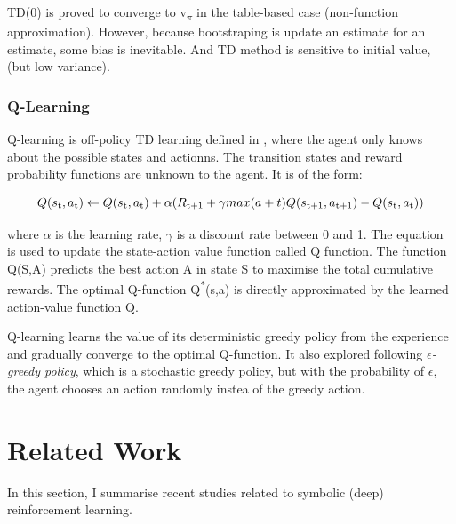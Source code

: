 \documentclass[12pt,twoside]{report}
\begin{document}
TD(0) is proved to converge to v\textsubscript{$\pi$} in the table-based case (non-function approximation).
However, because bootstraping is update an estimate for an estimate, some bias is inevitable. And TD method is sensitive to initial value, (but low variance).

\subsection{Q-Learning}

Q-learning is off-policy TD learning defined in \cite{Watkins}, where the agent only knows about the possible states and actionns. The transition states and reward probability functions are unknown to the agent.
It is of the form:

\begin{equation}
Q(s\textsubscript{t},a\textsubscript{t}) \leftarrow Q(s\textsubscript{t},a\textsubscript{t}) +  \alpha(R\textsubscript{t+1} + \gamma  max (a+t) Q(s\textsubscript{t+1}, a\textsubscript{t+1}) - Q(s\textsubscript{t}, a\textsubscript{t}))
\end{equation}

where $\alpha$ is the learning rate, $\gamma$ is a discount rate between 0 and 1. The equation is used to update the state-action value function called Q function. The function Q(S,A) predicts the best action A in state S to maximise the total cumulative rewards.
The optimal Q-function Q\textsuperscript{*}(s,a) is directly approximated by the learned action-value function Q.

Q-learning learns the value of its deterministic greedy policy from the experience and gradually converge to the optimal Q-function. It also explored following \textit{$\epsilon$-greedy policy}, which is a stochastic greedy policy, but with the probability of $\epsilon$, the agent chooses an action randomly instea of the greedy action.

\chapter{Related Work}
\label{related_work}
In this section, I summarise recent studies related to symbolic (deep) reinforcement learning.
\end{document}
